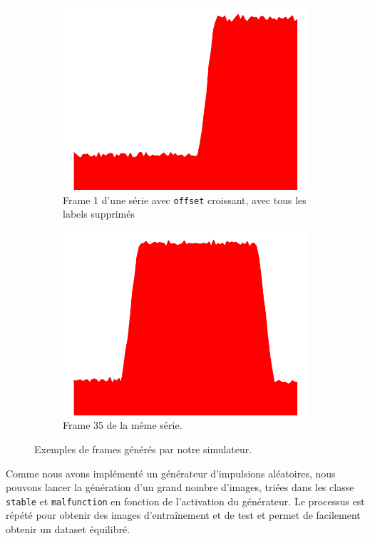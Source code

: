\documentclass[french]{article}
\theoremstyle{mytheoremstyle}
\theoremstyle{mytheoremstyle}
\theoremstyle{myproblemstyle}
\begin{document}
        \begin{figure}[H]
    \centering
    \begin{subfigure}[t]{0.45\textwidth}
            \centering
            \includegraphics[width=.75\linewidth]{images/frame1.png}
            \caption{Frame 1 d'une série avec \texttt{offset} croissant, avec tous les labels supprimés}
    \end{subfigure}
    \begin{subfigure}[t]{0.45\textwidth}
            \centering
           \includegraphics[width=.75\linewidth]{images/frame35.png}
            \caption{Frame 35 de la même série.}
    \end{subfigure}
    \caption{Exemples de frames générés par notre simulateur.}
\end{figure}

        
        Comme nous avons implémenté un générateur d'impulsions aléatoires, nous pouvons lancer la génération d'un grand nombre d'images, triées dans les classe \texttt{stable} et \texttt{malfunction} en fonction de l'activation du générateur. Le processus est répété pour obtenir des images d'entraînement et de test et permet de facilement obtenir un dataset équilibré.
        
\end{document}

